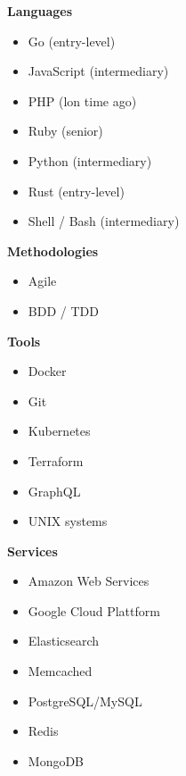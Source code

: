 \documentclass[9pt]{template} %
\begin{document}


\begin{minipage}[t]{0.3\textwidth} %
  \vspace{-\baselineskip}

  \textbf{Languages}
  \begin{itemize}
      \item Go {\footnotesize (entry-level)}
      \item JavaScript {\footnotesize (intermediary)}
      \item PHP {\footnotesize (lon  time ago)}
      \item Ruby {\footnotesize  (senior)}
      \item Python {\footnotesize  (intermediary)}
      \item Rust {\footnotesize (entry-level)}
      \item Shell / Bash {\footnotesize (intermediary)}
  \end{itemize}
\end{minipage}
\hfill
\begin{minipage}[t]{0.3\textwidth}
  \vspace{-\baselineskip}

  \textbf{Methodologies}
  \begin{itemize}
      \item Agile
      \item BDD / TDD
  \end{itemize}

  \textbf{Tools}
  \begin{itemize}
      \item Docker
      \item Git
      \item Kubernetes
      \item Terraform
      \item GraphQL
      \item UNIX systems
  \end{itemize}
\end{minipage}
\hfill
\begin{minipage}[t]{0.3\textwidth}
  \vspace{-\baselineskip}

  \textbf{Services}
  \begin{itemize}
      \item Amazon Web Services
      \item Google Cloud Plattform
      \item Elasticsearch
      \item Memcached
      \item PostgreSQL/MySQL
      \item Redis
      \item MongoDB
  \end{itemize}
\end{minipage}
\end{document}
